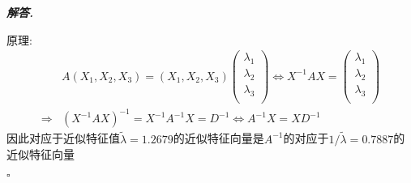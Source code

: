 \documentclass[10pt, a4paper, oneside]{ctexart}
\newenvironment{solution}{%
  \par\noindent\textbf{\textit{解答. }}\ignorespaces
}{%
  \hfill\ensuremath{\square}\par %
}
\begin{document}
\begin{solution}
原理:
\begin{align*}
    &A(X_1,X_2,X_3)=(X_1,X_2,X_3)\begin{pmatrix}
        \lambda_1\\
        \lambda_2\\
        \lambda_3\\
    \end{pmatrix}\iff X^{-1}AX=\begin{pmatrix}
        \lambda_1\\
        \lambda_2\\
        \lambda_3\\
    \end{pmatrix}\\
    \Rightarrow& (X^{-1}AX)^{-1}=X^{-1}A^{-1}X=D^{-1}\iff A^{-1}X=XD^{-1}
\end{align*}
因此对应于近似特征值$\tilde{\lambda}=1.2679$的近似特征向量是$A^{-1}$的对应于$1/\tilde{\lambda}=0.7887$的近似特征向量


\end{solution}
\end{document}
